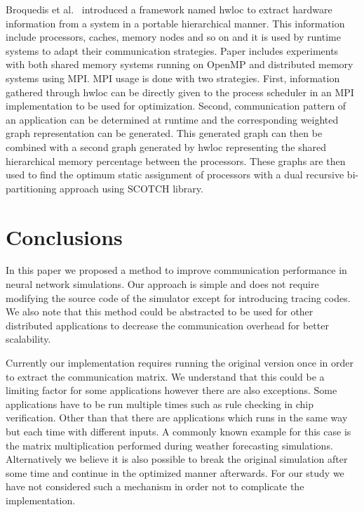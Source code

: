 \documentclass{article}
\begin{document}
Broquedis et al.~\cite{broquedis_hwloc:_2010} introduced a framework named hwloc to extract hardware information from a system in a portable hierarchical manner.
This information include processors, caches, memory nodes and so on and it is used by runtime systems to adapt their communication strategies.
Paper includes experiments with both shared memory systems running on OpenMP and distributed memory systems using MPI.
MPI usage is done with two strategies.
First, information gathered through hwloc can be directly given to the process scheduler in an MPI implementation to be used for optimization.
Second, communication pattern of an application can be determined at runtime and the corresponding weighted graph representation can be generated.
This generated graph can then be combined with a second graph generated by hwloc representing the shared hierarchical memory percentage between the processors.
These graphs are then used to find the optimum static assignment of processors with a dual recursive bi-partitioning approach using SCOTCH library.


\section{Conclusions}
\label{sec:conclusions}

In this paper we proposed a method to improve communication performance in neural network simulations.
Our approach is simple and does not require modifying the source code of the simulator except for introducing tracing codes.
We also note that this method could be abstracted to be used for other distributed applications to decrease the communication overhead for better scalability.

Currently our implementation requires running the original version once in order to extract the communication matrix.
We understand that this could be a limiting factor for some applications however there are also exceptions.
Some applications have to be run multiple times such as rule checking in chip verification.
Other than that there are applications which runs in the same way but each time with different inputs.
A commonly known example for this case is the matrix multiplication performed during weather forecasting simulations.
Alternatively we believe it is also possible to break the original simulation after some time and continue in the optimized manner afterwards.
For our study we have not considered such a mechanism in order not to complicate the implementation.
\end{document}
